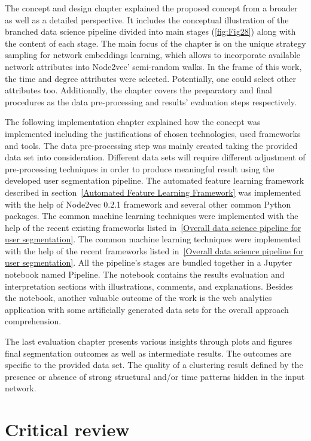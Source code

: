 The concept and design chapter explained the proposed concept from a broader as well as a detailed perspective. It includes the conceptual illustration of the branched data science pipeline divided into main stages (\autoref{fig:Fig28}) along with the content of each stage. The main focus of the chapter is on the unique strategy sampling for network embeddings learning, which allows to incorporate available network attributes into Node2vec' semi-random walks. In the frame of this work, the time and degree attributes were selected. Potentially, one could select other attributes too. Additionally, the chapter covers the preparatory and final procedures as the data pre-processing and results' evaluation steps respectively. 

The following implementation chapter explained how the concept was implemented including the justifications of chosen technologies, used frameworks and tools. The data pre-processing step was mainly created taking the provided data set into consideration. Different data sets will require different adjustment of pre-processing techniques in order to produce meaningful result using the developed user segmentation pipeline. The automated feature learning framework described in section~\ref{Automated Feature Learning Framework} was implemented with the help of Node2vec 0.2.1 framework and several other common Python packages. The common machine learning techniques were implemented with the help of the recent existing frameworks listed in~\ref{Overall data science pipeline for user segmentation}. The common machine learning techniques were implemented with the help of the recent frameworks listed in~\ref{Overall data science pipeline for user segmentation}. All the pipeline's stages are bundled together in a Jupyter notebook named Pipeline. The notebook contains the results evaluation and interpretation sections with illustrations, comments, and explanations. Besides the notebook, another valuable outcome of the work is the web analytics application with some artificially generated data sets for the overall approach comprehension.

The last evaluation chapter presents various insights through plots and figures final segmentation outcomes as well as intermediate results. The outcomes are specific to the provided data set. The quality of a clustering result defined by the presence or absence of strong structural and/or time patterns hidden in the input network.

\section{Critical review}

